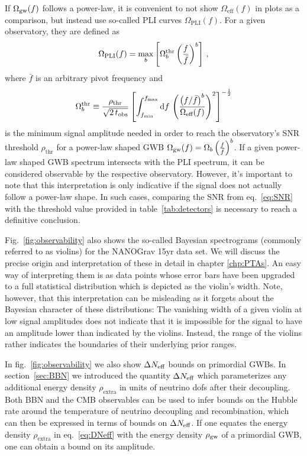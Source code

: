 If $\Omega_{\text{gw}}(f)$ follows a power-law, it  is convenient to not show $\Omega_\text{eff}(f)$ in plots as a comparison, but instead use so-called \ac{PLI} curves $\Omega_\text{PLI}(f)$. For a given observatory, they are defined as 
\begin{align}
		\Omega_\text{PLI}(f) = \max \limits_b \left[ \Omega_b^\text{thr}
		\left( \frac{f}{\bar{f}} \right)^b \right] \,,
\end{align}
where $\bar{f}$ is an arbitrary pivot frequency and
\begin{align}
	\Omega_b^\text{thr} \equiv \frac{\rho_\text{thr}}{\sqrt{2\, t_\text{obs}}} \left[  \int_{f_\text{min}}^{f_\text{max}} \mathop{}\!\mathrm{d} f \,
		\left(  \frac{\left( f/\bar{f} \right)^b}{\Omega_\text{eff}(f)}  \right)^2 \right]^{-\frac{1}{2}} 
\end{align}
is the minimum signal amplitude needed in order to reach the observatory's \ac{SNR} threshold $\rho_\text{thr}$ for a  power-law shaped \ac{GWB} $\Omega_{\text{gw}}(f) =  \Omega_b \left( \frac{f}{\bar{f}} \right)^b$. If a given power-law shaped \ac{GWB} spectrum intersects with the \ac{PLI} spectrum, it can be considered observable by the respective observatory. However, it’s important to note that this interpretation is only indicative if the signal does not actually follow a power-law shape. In such cases, comparing the \ac{SNR} from eq.~\eqref{eq:SNR} with the threshold value provided in table~\ref{tab:detectors} is necessary to reach a definitive conclusion.

Fig.~\ref{fig:observability} also shows the so-called Bayesian spectrograms (commonly referred to as violins) for the \ac{NANOGrav} 15yr data set. We will discuss the  precise origin and interpretation of these in detail in chapter \ref{chp:PTAs}. An easy way of interpreting them is as data points whose error bars have been upgraded to a full statistical distribution which is depicted as the violin's width. Note, however, that this interpretation can be misleading as it forgets about the Bayesian character of these distributions: The vanishing width of a given violin at low signal amplitudes does not indicate that it is impossible for the signal to have an amplitude lower than indicated by the violins. Instead, the range of the violins rather indicates the boundaries of their underlying prior ranges.

In fig.~\ref{fig:observability} we also show $\Delta N_\text{eff} $ bounds on primordial \acp{GWB}. In section~\ref{sec:BBN}  we introduced the quantity $\Delta N_\text{eff} $ which parameterizes any additional energy density $\rho_\text{extra}$ in units of neutrino \acp{dof} after their decoupling. Both \ac{BBN} and the \ac{CMB} observables can be used to infer bounds on the Hubble rate around the temperature of neutrino decoupling and recombination, which can then be expressed in terms of bounds on $\Delta N_\text{eff} $. If one equates the energy density $\rho_\text{extra}$ in eq.~\eqref{eq:DNeff} with the energy density $\rho_{\text{gw}}$ of a primordial \ac{GWB}, one can obtain a bound on its amplitude.

